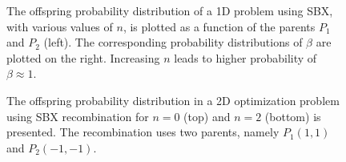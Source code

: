 \begin{itemize}
\begin{figure}[h!]
\begin{minipage}[b]{0.5\linewidth}
\end{minipage}
\caption{The offspring probability distribution of a 1D problem using SBX, with various values of $n$, is plotted as a function of the parents $P_1$ and $P_2$ (left). The corresponding probability distributions of $\beta$ are plotted on the right. Increasing $n$ leads to higher probability of $\beta \approx 1$.  }
\label{sbx}
\end{figure}

\begin{figure}[h!]
\begin{minipage}[b]{1\linewidth}
 \centering
\end{minipage}
\begin{minipage}[b]{1\linewidth}
 \centering
\end{minipage}
\caption{The offspring probability distribution in a 2D optimization problem using SBX recombination for $n\!=\!0$ (top) and $n\!=\!2$ (bottom) is presented. The recombination uses two parents, namely $P_1(1,1)$ and $P_2(-1,-1)$.}
\label{sbx2}
\end{figure}
\end{itemize}

